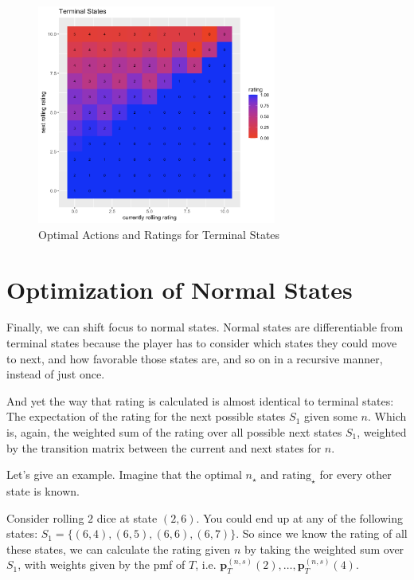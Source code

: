 \documentclass[a4paper]{article}
\begin{document}
\begin{figure}[h]
    \centering
    \includegraphics[width=0.7\textwidth]{Screenshot 2023-12-12 at 20.21.12.png}
    \caption{Optimal Actions and Ratings for Terminal States}
\end{figure}


\section{Optimization of Normal States}

Finally, we can shift focus to normal states. Normal states are differentiable from terminal states because the player has to consider which states they could move to next, and how favorable those states are, and so on in a recursive manner, instead of just once. 

And yet the way that rating is calculated is almost identical to terminal states: The expectation of the rating for the next possible states $S_1$ given some $n$. Which is, again, the weighted sum of the rating over all possible next states $S_1$, weighted by the transition matrix between the current and next states for $n$. 

Let's give an example. Imagine that the optimal $n_{\star}$ and $\text{rating}_{\star}$ for every other state is known. 

Consider rolling $2$ dice at state $(2, 6)$. You could end up at any of the following states: $S_1 = \{(6, 4), (6,5), (6,6), (6,7)\}$. So since we know the rating of all these states, we can calculate the rating given $n$ by taking the weighted sum over $S_1$, with weights given by the pmf of $T$, i.e. $\textbf{p}_{T}^{(n, s)}(2), \ldots, \textbf{p}_{T}^{(n, s)}(4)$.
\end{document}
